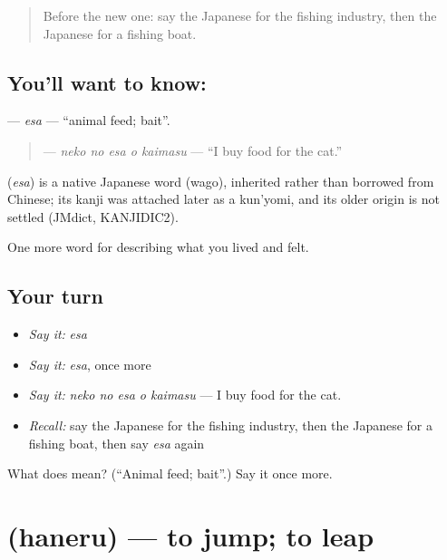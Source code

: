 \begin{quote}
Before the new one: say the Japanese for the fishing industry, then the Japanese for a fishing boat.
\end{quote}

\subsection*{You'll want to know: }
\textbf{} — \emph{esa} — \textquotedblleft{}animal feed; bait\textquotedblright{}.

\begin{quote}
\textbf{  } — \emph{neko no esa o kaimasu} — \textquotedblleft{}I buy food for the cat.\textquotedblright{}
\end{quote}

\begin{cousinweb}
\textbf{} (\emph{esa}) is a native Japanese word (wago), inherited rather than borrowed from Chinese; its kanji was attached later as a kun'yomi, and its older origin is not settled (JMdict, KANJIDIC2).
\end{cousinweb}

\begin{grammarlens}[title={What you've built}]
One more word for describing what you lived and felt.
\end{grammarlens}

\subsection*{Your turn}
\begin{itemize}
\raggedright
  \item \emph{Say it:} \emph{esa}
  \item \emph{Say it:} \emph{esa}, once more
  \item \emph{Say it:} \emph{neko no esa o kaimasu} — I buy food for the cat.
  \item \emph{Recall:} say the Japanese for the fishing industry, then the Japanese for a fishing boat, then say \emph{esa} again
\end{itemize}

\begin{tcolorbox}[breakable,colback=teal!4,colframe=teal!35!black,title={Before you move on}]
What does  mean? (\textquotedblleft{}Animal feed; bait\textquotedblright{}.) Say it once more.
\end{tcolorbox}
\section[\texorpdfstring{\ja{はねる} (haneru)}{はねる (haneru)}]{ (haneru) — to jump; to leap}

